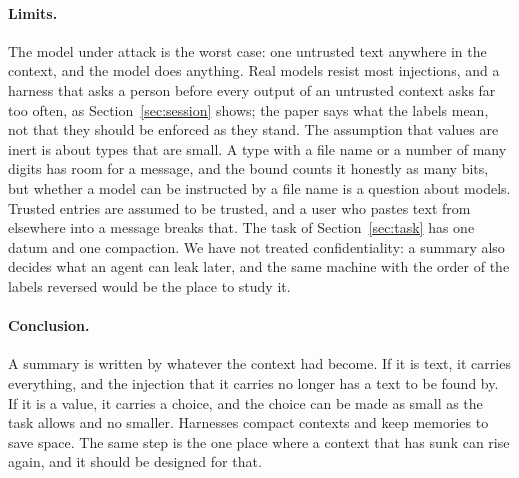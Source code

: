 \documentclass[acmsmall,nonacm,screen]{acmart}
\begin{document}
\paragraph{Limits.} The model under attack is the worst case: one untrusted text anywhere in
the context, and the model does anything. Real models resist most injections, and a harness
that asks a person before every output of an untrusted context asks far too often, as
Section~\ref{sec:session} shows; the paper says what the labels mean, not that they should be
enforced as they stand. The assumption that values are inert is about types that are small.
A type with a file name or a number of many digits has room for a message, and the bound
counts it honestly as many bits, but whether a model can be instructed by a file name is a
question about models. Trusted entries are assumed to be trusted, and a user who pastes text
from elsewhere into a message breaks that. The task of Section~\ref{sec:task} has one
datum and one compaction. We have not treated confidentiality: a summary also decides what an
agent can leak later, and the same machine with the order of the labels reversed would be
the place to study it.

\paragraph{Conclusion.} A summary is written by whatever the context had become. If it is
text, it carries everything, and the injection that it carries no longer has a text to be
found by. If it is a value, it carries a choice, and the choice can be made as small as the
task allows and no smaller. Harnesses compact contexts and keep memories to save space. The
same step is the one place where a context that has sunk can rise again, and it should be
designed for that.



\end{document}
